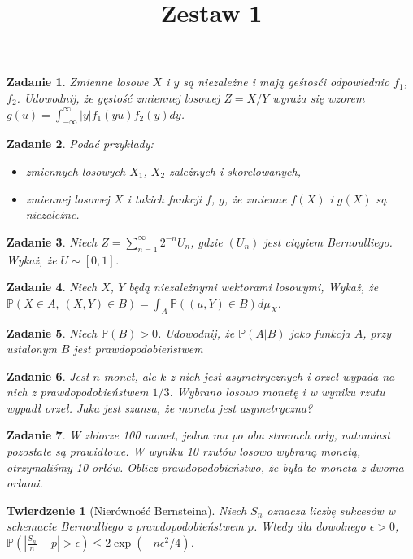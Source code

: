 \documentclass{mwart}
\title{Zestaw 1}
\newtheorem{tw}{Twierdzenie}
\newtheorem{zd}{Zadanie}
\begin{document}

\maketitle

\begin{zd}
Zmienne losowe $X$ i $y$ są niezależne i mają geśtosći odpowiednio $f_1$, $f_2$. Udowodnij, że gęstość zmiennej losowej $Z=X/Y$ wyraża się wzorem $g(u) = \int_{-\infty}^{\infty}|y|f_1(yu)f_2(y)dy$.
\end{zd}

\begin{zd}
Podać przykłady:
\begin{itemize}
\item zmiennych losowych $X_1$, $X_2$ zależnych i skorelowanych,
\item zmiennej losowej $X$ i takich funkcji $f$, $g$, że zmienne $f(X)$ i $g(X)$ są niezależne.
\end{itemize}
\end{zd}

\begin{zd}
Niech $Z=\sum_{n=1}^{\infty}2^{-n}U_n$, gdzie $(U_n)$ jest ciągiem Bernoulliego. Wykaż, że $U\sim [0, 1]$.
\end{zd}

\begin{zd}
Niech $X$, $Y$ będą niezależnymi wektorami losowymi, Wykaż, że $\mathbb{P}\left(X\in A,\ (X, Y)\in B\right) = \int_A\mathbb{P}\left((u, Y)\in B \right)d\mu_X$.
\end{zd}

\begin{zd}
Niech $\mathbb{P}(B) > 0$. Udowodnij, że $\mathbb{P}(A|B)$ jako funkcja $A$, przy ustalonym $B$ jest prawdopodobieństwem
\end{zd}

\begin{zd}
Jest $n$ monet, ale $k$ z nich jest asymetrycznych i orzeł wypada na nich z prawdopodobieństwem $1/3$. Wybrano losowo monetę i w wyniku rzutu wypadł orzeł. Jaka jest szansa, że moneta jest asymetryczna?
\end{zd}

\begin{zd}
W zbiorze 100 monet, jedna ma po obu stronach orły, natomiast pozostałe są prawidłowe. W wyniku 10 rzutów losowo wybraną monetą, otrzymaliśmy 10 orłów. Oblicz prawdopodobieństwo, że była to moneta z dwoma orłami.
\end{zd}

\begin{tw} [Nierówność Bernsteina]
Niech $S_n$ oznacza liczbę sukcesów w schemacie Bernoulliego z prawdopodobieństwem $p$. Wtedy dla dowolnego $\epsilon > 0$, $\mathbb{P}\left(\left|\frac{S_n}{n} -p \right| > \epsilon\right) \leq 2\exp(-n\epsilon^2/4)$.
\end{tw}
\end{document}
